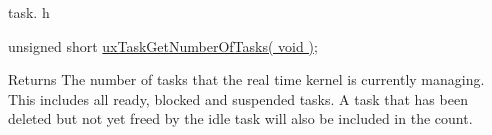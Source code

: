 task. h 
\begin{DoxyPre}unsigned short \hyperlink{tasks_8c_a192988eef7c43ec387493f4a29df4ce7}{uxTaskGetNumberOfTasks( void )};\end{DoxyPre}


\begin{DoxyReturn}{Returns}
The number of tasks that the real time kernel is currently managing. This includes all ready, blocked and suspended tasks. A task that has been deleted but not yet freed by the idle task will also be included in the count. 
\end{DoxyReturn}
